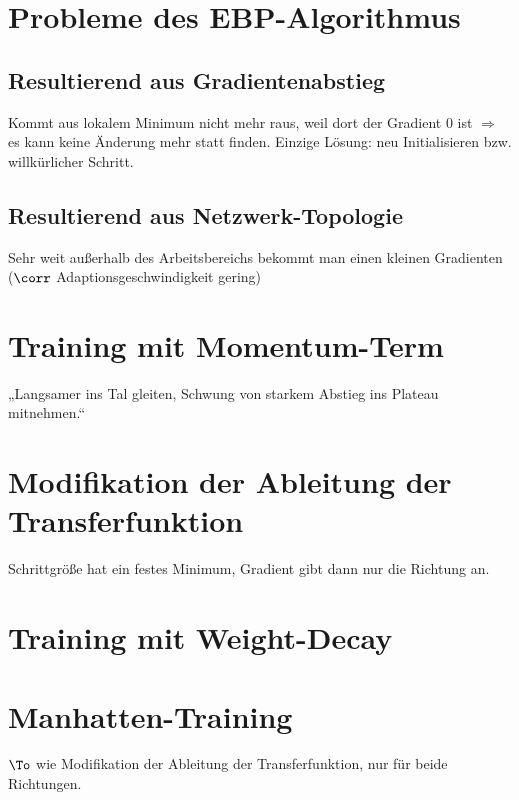 \section{Probleme des EBP-Algorithmus}
\subsection{Resultierend aus Gradientenabstieg}
Kommt aus lokalem Minimum nicht mehr raus, weil dort der Gradient $0$ ist $\Rightarrow$ es kann keine Änderung mehr statt finden. Einzige Lösung: neu Initialisieren bzw. willkürlicher Schritt.

\subsection{Resultierend aus Netzwerk-Topologie}
Sehr weit außerhalb des Arbeitsbereichs bekommt man einen kleinen Gradienten ($\corr$ Adaptionsgeschwindigkeit gering)

\section{Training mit Momentum-Term}
„Langsamer ins Tal gleiten, Schwung von starkem Abstieg ins Plateau mitnehmen.“

\section{Modifikation der Ableitung der Transferfunktion}
Schrittgröße hat ein festes Minimum, Gradient gibt dann nur die Richtung an.

\section{Training mit Weight-Decay}

\section{Manhatten-Training}
$\To$ wie Modifikation der Ableitung der Transferfunktion, nur für beide Richtungen.

